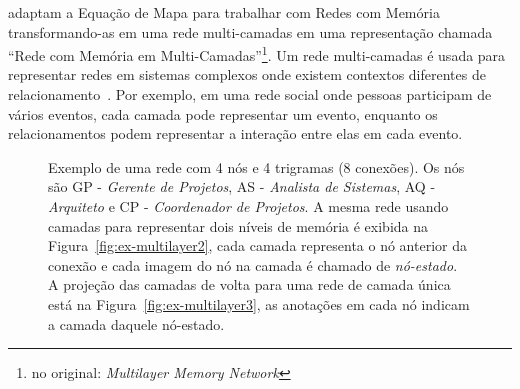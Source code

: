 \documentclass[
  article,
  11pt,
  a4paper,
  english,
  brazil,
  sumario=tradicional]{abntex2}
\begin{document}
 adaptam a Equação de Mapa  para trabalhar com  Redes com Memória transformando-as em uma rede multi-camadas em uma representação chamada \enquote{Rede com Memória em Multi-Camadas}\footnote{no original: \textit{Multilayer Memory Network}}. Um rede multi-camadas é usada para representar redes em sistemas complexos onde existem contextos diferentes de relacionamento~\cite{Kivela2014-pb}. Por exemplo, em uma rede social onde pessoas participam de vários eventos, cada camada pode representar um evento, enquanto os relacionamentos podem representar a interação entre elas em cada evento. 

\begin{figure}[htb]
    \centering
    \caption{Exemplo de uma rede com 4 nós e 4 trigramas (8 conexões). Os nós são GP - \textit{Gerente de Projetos}, AS - \textit{Analista de Sistemas}, AQ - \textit{Arquiteto} e CP - \textit{Coordenador de Projetos}. A mesma rede usando camadas para representar dois níveis de memória é exibida na Figura~\ref{fig:ex-multilayer2}, cada camada representa o nó anterior da conexão e cada imagem do nó na camada é chamado de \textit{nó-estado}. A projeção das camadas de volta para uma rede de camada única está na Figura~\ref{fig:ex-multilayer3}, as anotações em cada nó indicam a camada daquele nó-estado.}
    \label{fig:ex-multilayer-camadas}
\end{figure}
\end{document}
